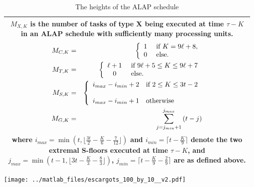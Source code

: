 \begin{frame}
\tiny
\begin{table}
\renewcommand{\arraystretch}{1.6}
\caption {The heights of the ALAP schedule}
\centering
\begin{tabular}{|c|}
\hline
\begin{minipage}{7cm}
$M_{X,K}$ is the number of
tasks of type X being executed at time $\tau - K$ in an ALAP schedule with
sufficiently many processing units.
\begin{eqnarray}
\nonumber
M_{C,K} & = &
\left\{\begin{array}{cl}
1&\textmd{ if } K = 9\ell +8,\\
0&\textmd{ else.}
\end{array}\right.\\
\nonumber
M_{T,K} & = &
\left\{\begin{array}{cl}
\ell+1&\textmd{ if } 9\ell + 5 \leq K \leq  9\ell + 7\\
0&\textmd{ else.}
\end{array}\right.\\
\nonumber
M_{S,K} & = &
\left\{\begin{array}{cl}

i_{max}  %
- i_{min} +2&\textmd{if } 2\leq K \leq 3t -2\\
\\
i_{max}  %
- i_{min} +1 &\textmd{otherwise}
\end{array}\right.\\
\nonumber
M_{G,K} & = &
\sum_{j = j_{min}+1}^{j_{max}}
\left( t - j \right)
\end{eqnarray}
where $i_{max} = \min\left(t, \lfloor \frac{3t}{2} - \frac{K}{6} - \frac{7}{12}
\rfloor \right)$ and $i_{min} = \lceil t - \frac{K}{9}\rceil$ denote the two
extremal S-floors executed at time $\tau-K$, and $j_{max} = \min\left(t-1,
\lfloor 3t - \frac{K}{3} - \frac{8}{3}\rfloor \right)$, $j_{min} = \lceil t -
\frac{K}{9} - \frac{2}{9}\rceil$ are as defined above.
\end{minipage}\\
\hline
\end{tabular}
\end{table}


\end{frame}

\begin{frame}

\texttt{[image: ../matlab\_files/escargots\_100\_by\_10\_\_v2.pdf]}\\

\end{frame}

